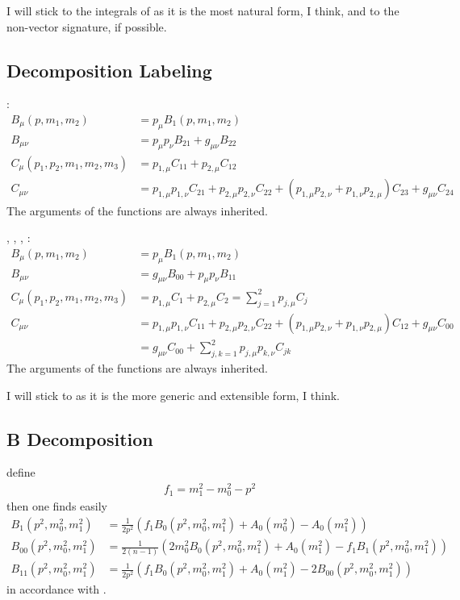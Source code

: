 I will stick to the integrals of \cite{Bojak:2000eu} as it is the most natural form, I think, and to the non-vector signature, if possible.

\subsection{Decomposition Labeling}
\cite{Passarino:1978jh,Bojak:2000eu}:
\begin{align}
B_\mu(p,m_1,m_2) &=p_{\mu} B_1(p,m_1,m_2)\\
B_{\mu\nu} &= p_{\mu}p_{\nu} B_{21}+g_{\mu\nu}B_{22}\\
C_{\mu}(p_1,p_2,m_1,m_2,m_3) &= p_{1,\mu}C_{11}+p_{2,\mu}C_{12}\\
C_{\mu\nu} &= p_{1,\mu}p_{1,\nu}C_{21}+p_{2,\mu}p_{2,\nu}C_{22}+(p_{1,\mu}p_{2,\nu}+p_{1,\nu}p_{2,\mu})C_{23}+g_{\mu\nu}C_{24}
\end{align}
The arguments of the functions are always inherited.

\HEPMath, \FeynCalc, \LoopTools, \cite{Ellis:2011cr}:
\begin{align}
B_\mu(p,m_1,m_2) &=p_{\mu} B_1(p,m_1,m_2)\\
B_{\mu\nu} &= g_{\mu\nu}B_{00}+p_{\mu}p_{\nu} B_{11}\\
C_{\mu}(p_1,p_2,m_1,m_2,m_3) &= p_{1,\mu}C_{1}+p_{2,\mu}C_{2}=\sum_{j=1}^2 p_{j,\mu}C_{j}\\
C_{\mu\nu} &= p_{1,\mu}p_{1,\nu}C_{11}+p_{2,\mu}p_{2,\nu}C_{22}+(p_{1,\mu}p_{2,\nu}+p_{1,\nu}p_{2,\mu})C_{12}+g_{\mu\nu}C_{00}\\
 &=g_{\mu\nu}C_{00} + \sum_{j,k=1}^2 p_{j,\mu}p_{k,\nu}C_{jk}
\end{align}
The arguments of the functions are always inherited.

I will stick to \HEPMath{} as it is the more generic and extensible form, I think.

\subsection{B Decomposition}
define
\begin{align}
f_1 = m_1^2-m_0^2-p^2
\end{align}
then one finds easily
\begin{align}
B_1(p^2,m_0^2,m_1^2) &= \frac 1 {2p^2}\left(f_1B_0(p^2,m_0^2,m_1^2)+A_0(m_0^2)-A_0(m_1^2)\right) \label{eq:B1}\\
B_{00}(p^2,m_0^2,m_1^2) &= \frac 1 {2(n-1)}\left(2m_0^2B_0(p^2,m_0^2,m_1^2)+A_0(m_1^2)-f_1B_1(p^2,m_0^2,m_1^2)\right)\\
B_{11}(p^2,m_0^2,m_1^2) &= \frac 1 {2p^2}\left(f_1B_0(p^2,m_0^2,m_1^2)+A_0(m_1^2)-2B_{00}(p^2,m_0^2,m_1^2)\right)
\end{align}
in accordance with \cite{Bojak:2000eu,Ellis:2011cr}.

